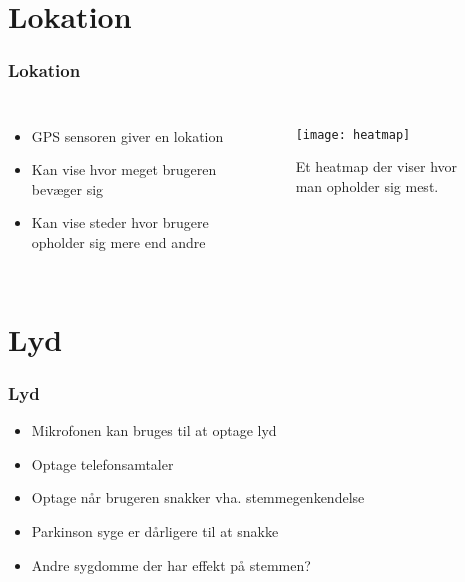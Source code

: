 \section{Lokation}
\begin{frame}[fragile]
\frametitle{Lokation}
\begin{columns}
\column[t]{5cm}
\begin{itemize}
\item GPS sensoren giver en lokation
\item Kan vise hvor meget brugeren bevæger sig
\item Kan vise steder hvor brugere opholder sig mere end andre
\end{itemize}
\column[t]{5cm}
\begin{figure}
\texttt{[image: heatmap]}
\caption{Et heatmap der viser hvor man opholder sig mest.}
\end{figure}
\end{columns}
\end{frame}



\section{Lyd}
\begin{frame}
\frametitle{Lyd}
\begin{itemize}
\item Mikrofonen kan bruges til at optage lyd
\item Optage telefonsamtaler
\item Optage når brugeren snakker vha. stemmegenkendelse
\item Parkinson syge er dårligere til at snakke
\item Andre sygdomme der har effekt på stemmen?
\end{itemize}
\end{frame}